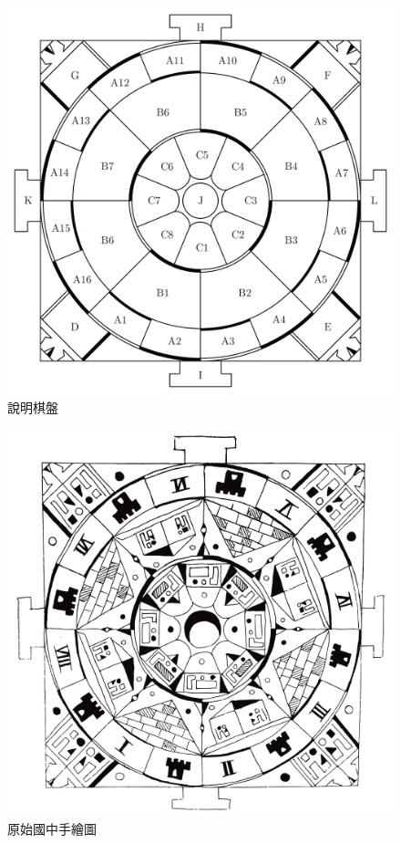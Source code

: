 \documentclass[11pt,a4paper]{article}
\begin{document}
\begin{figure}
	\caption{說明棋盤}
	\label{b}
	\centerline{ \includegraphics[scale = 0.4]{Mandala_exp} }
\end{figure}

\begin{figure}
	\caption{原始國中手繪圖}
	\label{c}
	\centerline{ \includegraphics[scale = 0.4]{Mandala_traced-01} }
\end{figure}
\end{document}
